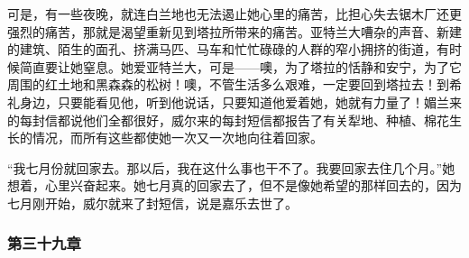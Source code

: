 \par 可是，有一些夜晚，就连白兰地也无法遏止她心里的痛苦，比担心失去锯木厂还更强烈的痛苦，那就是渴望重新见到塔拉所带来的痛苦。亚特兰大嘈杂的声音、新建的建筑、陌生的面孔、挤满马匹、马车和忙忙碌碌的人群的窄小拥挤的街道，有时候简直要让她窒息。她爱亚特兰大，可是——噢，为了塔拉的恬静和安宁，为了它周围的红土地和黑森森的松树！噢，不管生活多么艰难，一定要回到塔拉去！到希礼身边，只要能看见他，听到他说话，只要知道他爱着她，她就有力量了！媚兰来的每封信都说他们全都很好，威尔来的每封短信都报告了有关犁地、种植、棉花生长的情况，而所有这些都使她一次又一次地向往着回家。
\par “我七月份就回家去。那以后，我在这什么事也干不了。我要回家去住几个月。”她想着，心里兴奋起来。她七月真的回家去了，但不是像她希望的那样回去的，因为七月刚开始，威尔就来了封短信，说是嘉乐去世了。

\subsubsection{第三十九章}

